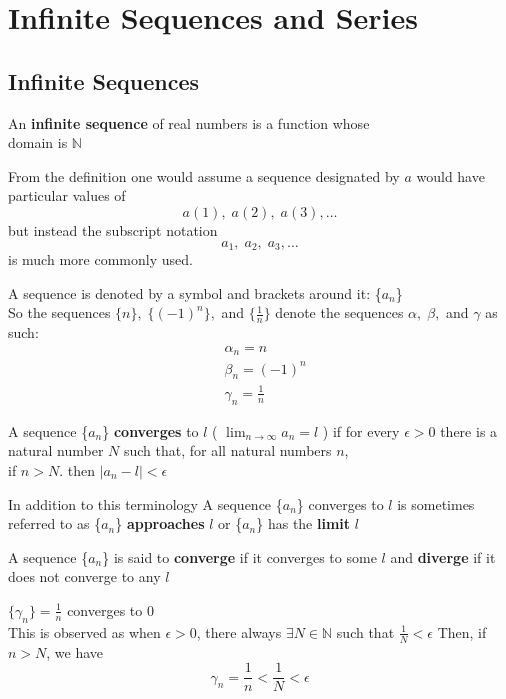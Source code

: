 \chapter{Infinite Sequences and Series}
\setcounter{section}{0}
\section{Infinite Sequences}
\begin{definition}
    An \textbf{infinite sequence} of real numbers is a function whose \\
    domain is $ \mathbb{N} $
\end{definition}

From the definition one would assume a sequence designated by $a$ would have particular values of 
    $$a(1), \; a(2), \; a(3), \dots $$
but instead the subscript notation 
    $$a_1, \; a_2, \; a_3, \dots$$
is much more commonly used. \bigskip

A sequence is denoted by a symbol and brackets around it: \{$a_n$\} \\
So the sequences $\{n\}, \; \{(-1)^n\},$ and $\{\frac{1}{n}\}$ denote the sequences $\alpha, \; \beta,$ and $\gamma$ as such:
\begin{align*}
    &\alpha_n = n \\
    &\beta_n = (-1)^n \\
    &\gamma_n = \frac{1}{n}
\end{align*}
\begin{definition}
    A sequence \{$a_n$\} \textbf{converges} to $l$ ( $\lim_{n \to \infty} a_n = l$ ) if for every $\epsilon >0$ there is a natural number $N$ such that, for all natural numbers $n$, \\ 
    if $n > N$. then $| a_n - l| < \epsilon$
\end{definition} \bigskip

In addition to this terminology A sequence \{$a_n$\} converges to $l$ is sometimes referred to as \{$a_n$\}  \textbf{approaches} $l$ or \{$a_n$\} has the \textbf{limit} $l$ \bigskip

A sequence \{$a_n$\} is said to \textbf{converge} if it converges to some $l$ and \textbf{diverge} if it does not converge to any $l$

\begin{eg}
    $\{ \gamma_n \} = \frac{1}{n}$ converges to $0$ \\ 
    This is observed as when $\epsilon > 0$, there always $\exists N\in \mathbb{N}$ such that $\frac{1}{N} < \epsilon$ Then, if $n > N$, we have 
        $$\gamma_n = \frac{1}{n} < \frac{1}{N} < \epsilon$$
\end{eg}

